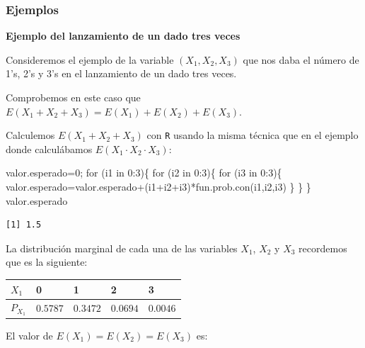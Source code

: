 \documentclass[
  letterpaper,
  DIV=11,
  numbers=noendperiod]{scrreprt}
\newenvironment{Shaded}{\begin{snugshade}}{\end{snugshade}}
\newcommand{\ControlFlowTok}[1]{\textcolor[rgb]{0.00,0.23,0.31}{#1}}
\newcommand{\DecValTok}[1]{\textcolor[rgb]{0.68,0.00,0.00}{#1}}
\newcommand{\FunctionTok}[1]{\textcolor[rgb]{0.28,0.35,0.67}{#1}}
\newcommand{\NormalTok}[1]{\textcolor[rgb]{0.00,0.23,0.31}{#1}}
\newcommand{\OtherTok}[1]{\textcolor[rgb]{0.00,0.23,0.31}{#1}}
\newcommand{\SpecialCharTok}[1]{\textcolor[rgb]{0.37,0.37,0.37}{#1}}
\begin{document}
\hypertarget{ejemplos-13}{%
\subsubsection{Ejemplos}\label{ejemplos-13}}

\textbf{Ejemplo del lanzamiento de un dado tres veces}

Consideremos el ejemplo de la variable \((X_1,X_2,X_3)\) que nos daba el
número de 1's, 2's y 3's en el lanzamiento de un dado tres veces.

Comprobemos en este caso que \(E(X_1+X_2+X_3)=E(X_1)+E(X_2)+E(X_3)\).

Calculemos \(E(X_1+X_2+X_3)\) con \texttt{R} usando la misma técnica que
en el ejemplo donde calculábamos \(E(X_1\cdot X_2\cdot X_3)\):

\begin{Shaded}
\begin{Highlighting}[]
\NormalTok{valor.esperado}\OtherTok{=}\DecValTok{0}\NormalTok{;}
\ControlFlowTok{for}\NormalTok{ (i1 }\ControlFlowTok{in} \DecValTok{0}\SpecialCharTok{:}\DecValTok{3}\NormalTok{)\{}
  \ControlFlowTok{for}\NormalTok{ (i2 }\ControlFlowTok{in} \DecValTok{0}\SpecialCharTok{:}\DecValTok{3}\NormalTok{)\{}
    \ControlFlowTok{for}\NormalTok{ (i3 }\ControlFlowTok{in} \DecValTok{0}\SpecialCharTok{:}\DecValTok{3}\NormalTok{)\{}
\NormalTok{      valor.esperado}\OtherTok{=}\NormalTok{valor.esperado}\SpecialCharTok{+}\NormalTok{(i1}\SpecialCharTok{+}\NormalTok{i2}\SpecialCharTok{+}\NormalTok{i3)}\SpecialCharTok{*}\FunctionTok{fun.prob.con}\NormalTok{(i1,i2,i3)}
\NormalTok{    \}}
\NormalTok{  \}}
\NormalTok{\}}
\NormalTok{valor.esperado}
\end{Highlighting}
\end{Shaded}

\begin{verbatim}
[1] 1.5
\end{verbatim}

La distribución marginal de cada una de las variables \(X_1\), \(X_2\) y
\(X_3\) recordemos que es la siguiente:

\begin{longtable}[]{@{}lllll@{}}
\toprule\noalign{}
\(X_1\) & 0 & 1 & 2 & 3 \\
\midrule\noalign{}
\endhead
\bottomrule\noalign{}
\endlastfoot
\(P_{X_1}\) & \(0.5787\) & \(0.3472\) & \(0.0694\) & \(0.0046\) \\
\end{longtable}

El valor de \(E(X_1)=E(X_2)=E(X_3)\) es:
\end{document}
